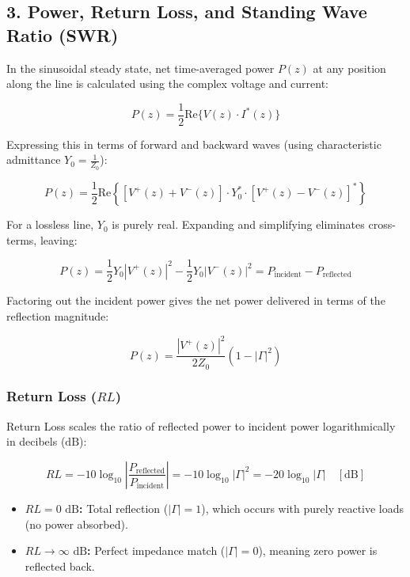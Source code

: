 \documentclass[
]{article}
\providecommand{\tightlist}{%
  \setlength{\itemsep}{0pt}\setlength{\parskip}{0pt}}
\begin{document}
\subsection{3. Power, Return Loss, and Standing Wave Ratio
(SWR)}\label{power-return-loss-and-standing-wave-ratio-swr}

In the sinusoidal steady state, net time-averaged power \(P(z)\) at any
position along the line is calculated using the complex voltage and
current:

\[P(z) = \frac{1}{2} \text{Re}\{V(z) \cdot I^*(z)\}\]

Expressing this in terms of forward and backward waves (using
characteristic admittance \(Y_0 = \frac{1}{Z_0}\)):

\[P(z) = \frac{1}{2} \text{Re}\left\{ [V^+(z) + V^-(z)] \cdot Y_0^* \cdot [V^+(z) - V^-(z)]^* \right\}\]

For a lossless line, \(Y_0\) is purely real. Expanding and simplifying
eliminates cross-terms, leaving:

\[P(z) = \frac{1}{2} Y_0 |V^+(z)|^2 - \frac{1}{2} Y_0 |V^-(z)|^2 = P_{\text{incident}} - P_{\text{reflected}}\]

Factoring out the incident power gives the net power delivered in terms
of the reflection magnitude:

\[P(z) = \frac{|V^+(z)|^2}{2Z_0} \left(1 - |\Gamma|^2\right)\]

\subsubsection{\texorpdfstring{Return Loss
(\(RL\))}{Return Loss (RL)}}\label{return-loss-rl}

Return Loss scales the ratio of reflected power to incident power
logarithmically in decibels (\(\text{dB}\)):

\[RL = -10 \log_{10} \left| \frac{P_{\text{reflected}}}{P_{\text{incident}}} \right| = -10 \log_{10} |\Gamma|^2 = -20 \log_{10} |\Gamma| \quad [\text{dB}]\]

\begin{itemize}
\tightlist
\item
  \textbf{\(RL = 0\text{ dB}\):} Total reflection (\(|\Gamma| = 1\)),
  which occurs with purely reactive loads (no power absorbed).
\item
  \textbf{\(RL \to \infty\text{ dB}\):} Perfect impedance match
  (\(|\Gamma| = 0\)), meaning zero power is reflected back.
\end{itemize}
\end{document}
